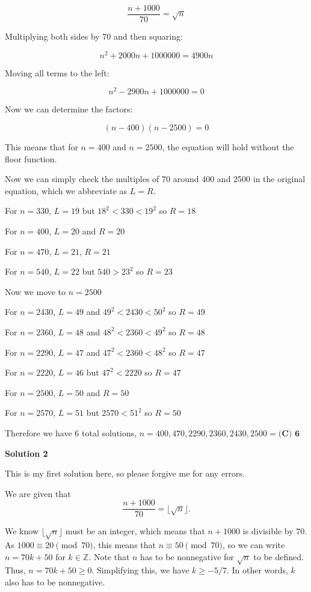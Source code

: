 \begin{enumerate}
 
 \[\dfrac{n+1000}{70} = \sqrt{n}\]

 Multiplying both sides by 70 and then squaring:

 
 \[n^2 + 2000n + 1000000 = 4900n\]

 Moving all terms to the left:

 
 \[n^2 - 2900n + 1000000 = 0\]

 Now we can determine the factors:

 
 \[(n-400)(n-2500) = 0\]

 This means that for $n = 400$ and $n = 2500$, the equation will hold without the floor function.

 Now we can simply check the multiples of 70 around 400 and 2500 in the original equation, which we abbreviate as $L=R$.

 For $n = 330$, $L=19$ but $18^2 < 330 < 19^2$ so $R=18$

 For $n = 400$,  $L=20$ and  $R=20$

 For $n = 470$,  $L=21$,  $R=21$

 For $n = 540$, $L=22$ but $540 > 23^2$ so   $R=23$

 Now we move to $n = 2500$

 For $n = 2430$,  $L=49$ and $49^2 < 2430 < 50^2$ so $R=49$

 For $n = 2360$,  $L=48$ and $48^2 < 2360 < 49^2$ so $R=48$

 For $n = 2290$,  $L=47$ and $47^2 < 2360 < 48^2$ so  $R=47$

 For $n = 2220$, $L=46$ but $47^2 < 2220$ so  $R=47$

 For $n = 2500$,  $L=50$ and $R=50$

 For $n = 2570$, $L=51$ but $2570 < 51^2$ so $R=50$

 Therefore we have 6 total solutions, $n = 400, 470, 2290, 2360, 2430, 2500 = \boxed{\textbf{(C) 6}}$




\textbf{Solution 2}

This is my first solution here, so please forgive me for any errors.

 We are given that 
 \[\frac{n+1000}{70}=\lfloor\sqrt{n}\rfloor.\]

 We know $\lfloor\sqrt{n}\rfloor$ must be an integer, which means that $n+1000$ is divisible by $70$. As $1000\equiv 20\pmod{70}$, this means that $n\equiv 50\pmod{70}$, so we can write $n=70k+50$ for $k\in\mathbb{Z}$. Note that $n$ has to be nonnegative for $\sqrt{n}$ to be defined. Thus, $n = 70k + 50 \geq 0$. Simplifying this, we have $k \geq -5/7$. In other words, $k$ also has to be nonnegative.


\end{enumerate}
